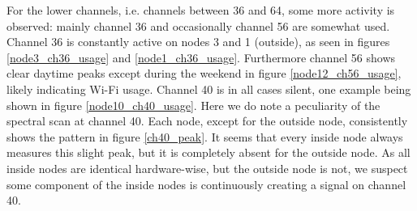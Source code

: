 \documentclass[a4paper, 11pt]{article}
\begin{document}
For the lower channels, i.e. channels between 36 and 64, some more activity is observed: mainly channel 36 and occasionally channel 56 are somewhat used. Channel 36 is constantly active on nodes 3 and 1 (outside), as seen in figures \ref{node3_ch36_usage} and \ref{node1_ch36_usage}. Furthermore channel 56 shows clear daytime peaks except during the weekend in figure \ref{node12_ch56_usage}, likely indicating Wi-Fi usage. Channel 40 is in all cases silent, one example being shown in figure \ref{node10_ch40_usage}. Here we do note a peculiarity of the spectral scan at channel 40. Each node, except for the outside node, consistently shows the pattern in figure \ref{ch40_peak}. It seems that every inside node always measures this slight peak, but it is completely absent for the outside node. As all inside nodes are identical hardware-wise, but the outside node is not, we suspect some component of the inside nodes is continuously creating a signal on channel 40.
\end{document}
